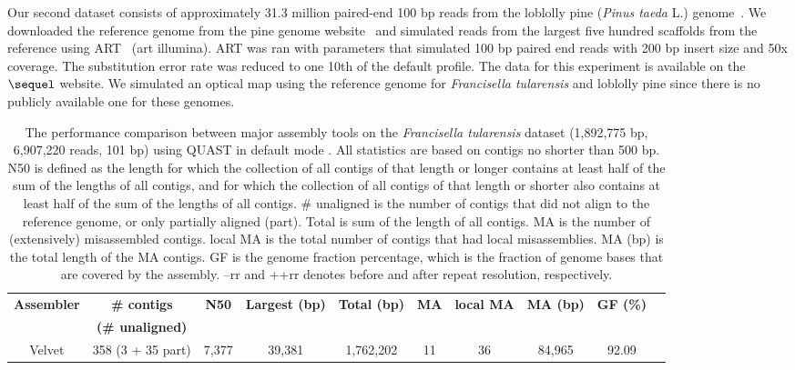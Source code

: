 \documentclass[doctor]{thesis}
\begin{document}
Our second dataset consists of approximately  31.3 million paired-end 100 bp reads from the loblolly pine  ({\em Pinus taeda} L.) genome~\cite{pine}.  
We downloaded the reference genome from the pine genome website~\cite{pinetreeweb} and simulated reads from the largest five hundred scaffolds from the reference using ART~\cite{art} (art illumina). 
ART was ran with parameters that simulated 100 bp paired end reads with 200 bp insert size and 50x coverage.  
The substitution error rate was reduced to one 10th of the default profile.  
The data for this experiment is available on the $\sequel$ website.  
We simulated an optical map using the reference genome for {\em Francisella tularensis} and loblolly pine since there is no publicly available one for these genomes.  




\begin{table}[h!]
\begin{center}
\caption{The performance comparison between major assembly tools on the \emph{Francisella tularensis} dataset  (1,892,775 bp, 6,907,220 reads, 101 bp)  using QUAST in default mode \cite{quast}. 
All statistics are based on contigs no shorter than 500 bp. N50 is defined as the length for which the collection of all contigs of that length or longer contains at least half of the sum of the lengths of all contigs, and for which the collection of all contigs of that length or shorter also contains at least half of the sum of the lengths of all contigs.  
\# unaligned is the number of contigs that did not align to the reference genome, or only partially aligned (part).  
Total is sum of the length of all contigs. 
MA is the number of (extensively) misassembled contigs.  
local MA is the total number of contigs that had local misassemblies. 
MA (bp) is the total length of the MA contigs.  
GF is the genome fraction percentage, which is the fraction of genome bases that are covered by the assembly. 
--rr and ++rr denotes before and after repeat resolution, respectively.}
\begin{tabular}{|c|c|c|c|c|c|c|c|c|c}
\hline
\textbf{Assembler} 			&{\bf \# contigs }		& \textbf{N50}	& \textbf{Largest (bp)}	& \textbf{Total (bp) }	&\textbf{MA}	&\textbf{local MA}	& {\bf MA (bp)} 		& \textbf{GF (\%)} \\ 
 						&{\bf (\# unaligned) }		& 			& 					& 				&			& 			& 				& \\ \hline
Velvet					& 358 (3 + 35 part)		& 7,377		& 39,381				& 1,762,202 		& 11			& 36			& 84,965			& 92.09			  \\ \hline

\end{tabular}
\end{center}
\end{table}
\end{document}
